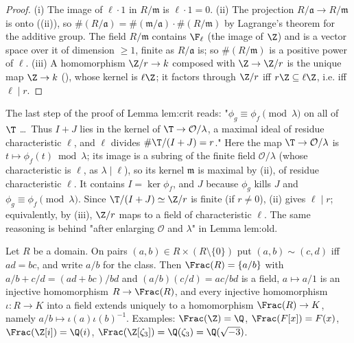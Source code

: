 \begin{proof}
(i) The image of $\ell\cdot1$ in $R/\mathfrak m$ is $\ell\cdot1=0$.
(ii) The projection $R/\mathfrak a\to R/\mathfrak m$ is onto ((ii)), so $\#(R/\mathfrak a)=\#(\mathfrak m/\mathfrak a)\cdot\#(R/\mathfrak m)$ by
Lagrange's theorem for the additive group. The field $R/\mathfrak m$ contains $\F_\ell$ (the image of $\Z$) and is a vector space over
it of dimension $\ge1$, finite as $R/\mathfrak a$ is; so $\#(R/\mathfrak m)$ is a positive power of $\ell$.
(iii) A homomorphism $\Z/r\to k$ composed with $\Z\to\Z/r$ is the unique map $\Z\to k$ (), whose kernel is
$\ell\Z$; it factors through $\Z/r$ iff $r\Z\subseteq\ell\Z$, i.e. iff $\ell\mid r$.
\end{proof}

\begin{paperlink}\label{pl:rings:crit-last}
The last step of the proof of Lemma lem:crit reads: "$\phi_g\equiv\phi_f\pmod\lambda$ on all of $\T$ \dots\ Thus $I+J$ lies in the
kernel of $\T\to\mathcal O/\lambda$, a maximal ideal of residue characteristic $\ell$, and $\ell$ divides $\#\T/(I+J)=r$." Here the
map $\T\to\mathcal O/\lambda$ is $t\mapsto\phi_f(t)\bmod\lambda$; its image is a subring of the finite field $\mathcal O/\lambda$ (whose
characteristic is $\ell$, as $\lambda\mid\ell$), so its kernel $\mathfrak m$ is maximal by (ii), of residue
characteristic $\ell$. It contains $I=\ker\phi_f$, and $J$ because $\phi_g$ kills $J$ and $\phi_g\equiv\phi_f\pmod\lambda$. Since
$\T/(I+J)\simeq\Z/r$ is finite (if $r\ne0$), (ii) gives $\ell\mid r$; equivalently, by (iii), $\Z/r$ maps to a field of
characteristic $\ell$. The same reasoning is behind "after enlarging $\mathcal O$ and $\lambda$" in Lemma lem:old.
\end{paperlink}

\begin{theorem}\label{thm:rings:fractions}
Let $R$ be a domain. On pairs $(a,b)\in R\times(R\setminus\{0\})$ put $(a,b)\sim(c,d)$ iff $ad=bc$, and write $a/b$ for the class. Then
$\Frac(R)=\{a/b\}$ with $a/b+c/d=(ad+bc)/bd$ and $(a/b)(c/d)=ac/bd$ is a field, $a\mapsto a/1$ is an injective homomorphism $R\to\Frac(R)$,
and every injective homomorphism $\iota\colon R\to K$ into a field extends uniquely to a homomorphism $\Frac(R)\to K$, namely
$a/b\mapsto\iota(a)\iota(b)^{-1}$. Examples: $\Frac(\Z)=\Q$, $\Frac(F[x])=F(x)$, $\Frac(\Z[i])=\Q(i)$, $\Frac(\Z[\zeta_3])=\Q(\zeta_3)=\Q(\sqrt{-3})$.
\end{theorem}

